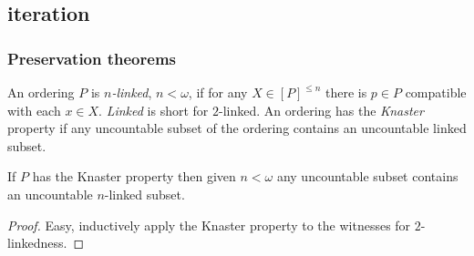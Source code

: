 \subsection{iteration}

%


\subsubsection{Preservation theorems}
\begin{definition} An ordering $P$ is \emph{$n$-linked}, $n<\omega$, if for any $X\in[P]^{\leq n}$ there is
$p\in P$ compatible with each $x\in X$. \emph{Linked} is short for $2$-linked. An ordering has the \emph{Knaster} property if any uncountable subset of the ordering contains an uncountable linked subset.
\end{definition}

\begin{obs} If $P$ has the Knaster property then given $n<\omega$ any uncountable subset contains
 an uncountable $n$-linked subset.
\end{obs}
\begin{proof} Easy, inductively apply the Knaster property to the witnesses for $2$-linkedness.
\end{proof}

